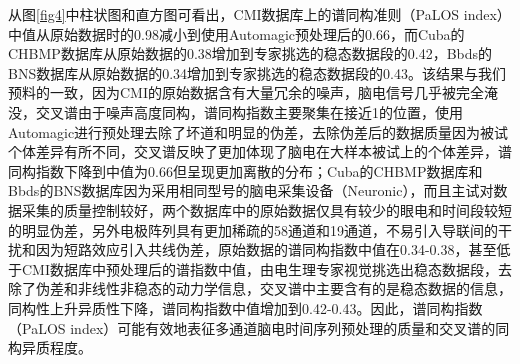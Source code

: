 从图\ref{fig4}中柱状图和直方图可看出，CMI数据库上的谱同构准则（PaLOS index）中值从原始数据时的0.98减小到使用Automagic预处理后的0.66，而Cuba的CHBMP数据库从原始数据的0.38增加到专家挑选的稳态数据段的0.42，Bbds的BNS数据库从原始数据的0.34增加到专家挑选的稳态数据段的0.43。该结果与我们预料的一致，因为CMI的原始数据含有大量冗余的噪声，脑电信号几乎被完全淹没，交叉谱由于噪声高度同构，谱同构指数主要聚集在接近1的位置，使用Automagic进行预处理去除了坏道和明显的伪差，去除伪差后的数据质量因为被试个体差异有所不同，交叉谱反映了更加体现了脑电在大样本被试上的个体差异，谱同构指数下降到中值为0.66但呈现更加离散的分布；Cuba的CHBMP数据库和Bbds的BNS数据库因为采用相同型号的脑电采集设备（Neuronic），而且主试对数据采集的质量控制较好，两个数据库中的原始数据仅具有较少的眼电和时间段较短的明显伪差，另外电极阵列具有更加稀疏的58通道和19通道，不易引入导联间的干扰和因为短路效应引入共线伪差，原始数据的谱同构指数中值在0.34-0.38，甚至低于CMI数据库中预处理后的谱指数中值，由电生理专家视觉挑选出稳态数据段，去除了伪差和非线性非稳态的动力学信息，交叉谱中主要含有的是稳态数据的信息，同构性上升异质性下降，谱同构指数中值增加到0.42-0.43。因此，谱同构指数（PaLOS index）可能有效地表征多通道脑电时间序列预处理的质量和交叉谱的同构异质程度。

